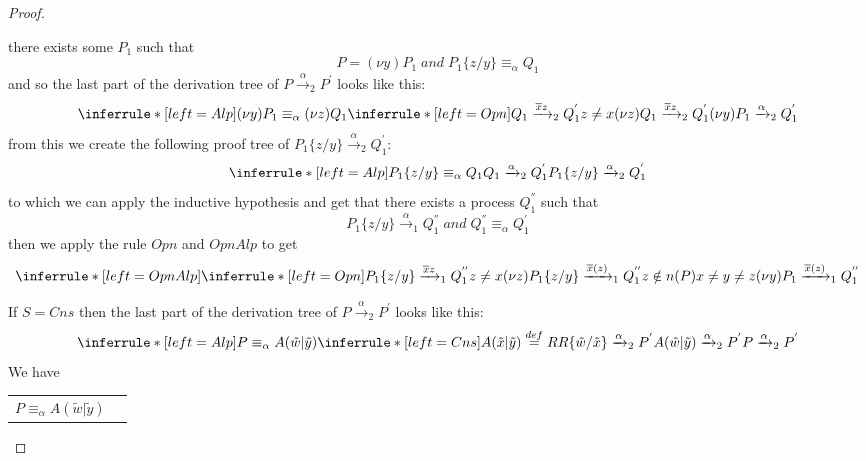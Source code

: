 \begin{theorem}
\begin{proof}
\begin{description}
\begin{description}
\begin{itemize}
		there exists some $P_{1}$ such that 
		\[
		  P=(\nu y)P_{1}\; and\; P_{1}\{z/y\}\equiv_{\alpha}Q_{1}
		\]
		and so the last part of the derivation tree of $P\xrightarrow{\alpha}_{2}P^{'}$ looks like this:
		\[
		  \inferrule* [left=Alp]{
		      (\nu y)P_{1}\equiv_{\alpha}(\nu z)Q_{1}
		    \\
		      \inferrule* [left=Opn]{
			  Q_{1}\xrightarrow{\overline{x}z}_{2}Q_{1}^{'}
			\\
			  z\neq x
		      }{
			(\nu z)Q_{1}\xrightarrow{\overline{x}z}_{2}Q_{1}^{'}
		      }
		  }{
		    (\nu y)P_{1}\xrightarrow{\alpha}_{2}Q_{1}^{'}
		  }
		\]
		from this we create the following proof tree of $P_{1}\{z/y\}\xrightarrow{\alpha}_{2}Q_{1}^{'}$:
		\[
		  \inferrule* [left=Alp]{
		      P_{1}\{z/y\}\equiv_{\alpha}Q_{1}
		    \\
		      Q_{1}\xrightarrow{\alpha}_{2}Q_{1}^{'}
		  }{
		    P_{1}\{z/y\}\xrightarrow{\alpha}_{2}Q_{1}^{'}
		  }		
		\]
		to which we can apply the inductive hypothesis and get that there exists a process $Q_{1}^{''}$ such that
		\[
		  P_{1}\{z/y\}\xrightarrow{\alpha}_{1}Q_{1}^{''}\;and\; Q_{1}^{''}\equiv_{\alpha}Q_{1}^{'}
		\]
		then we apply the rule $Opn$ and $OpnAlp$ to get
		\[
		  \inferrule* [left=OpnAlp]{
		      \inferrule* [left=Opn]{
			  P_{1}\{z/y\} \xrightarrow{\overline{x}z}_{1}Q_{1}^{''}
			\\
			  z\neq x
		      }{
			(\nu z)P_{1}\{z/y\} \xrightarrow{\overline{x}(z)}_{1}Q_{1}^{''}
		      }
		    \\
		      z\notin n(P)
		    \\
		      x\neq y\neq z
		  }{
		    (\nu y)P_{1} \xrightarrow{\overline{x}(z)}_{1}Q_{1}^{''}
		  }
		\]
	    \end{itemize}
	  \item[Cns]
	    If $S=Cns$ then the last part of the derivation tree of $P\xrightarrow{\alpha}_{2}P^{'}$ looks like this:
		\[
		  \inferrule* [left=Alp]{
		      P\equiv_{\alpha}A(\tilde{w}|\tilde{y})
		    \\
		      \inferrule* [left=Cns]{
			  A(\tilde{x}|\tilde{y})\stackrel{def}{=}R
			\\
			  R\{\tilde{w}/\tilde{x}\}\xrightarrow{\alpha}_{2}P^{'}
		      }{
			A(\tilde{w}|\tilde{y})\xrightarrow{\alpha}_{2}P^{'}
		      }
		  }{
		    P\xrightarrow{\alpha}_{2}P^{'}
		  }
		\]
	    We have
	    \begin{center}
	      \begin{tabular}{ll}
		  $P\equiv_{\alpha}A(\tilde{w}|\tilde{y})$ &
		\\

\end{tabular}
\end{center}
\end{description}
\end{description}
\end{proof}
\end{theorem}
